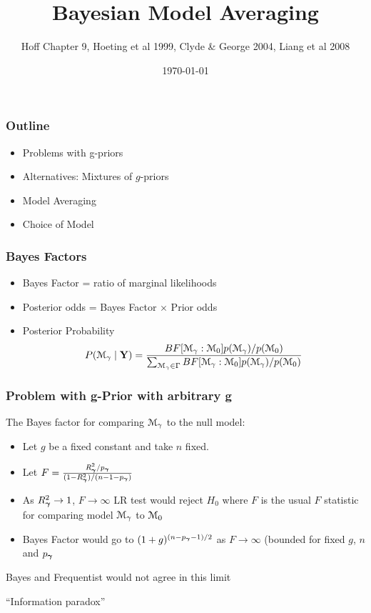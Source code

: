 \documentclass[handout]{beamer}\usepackage[]{graphicx}\usepackage[]{color}
\title{Bayesian Model Averaging}
\author{Hoff Chapter 9, Hoeting et al 1999, Clyde \& George 2004, Liang et al 2008}
\date{\today}
\begin{document}
\maketitle

\begin{frame} \frametitle{Outline}

\begin{itemize}
\item Problems with g-priors
\item Alternatives:  Mixtures of $g$-priors
\item Model Averaging
\item Choice of Model
\end{itemize}

\end{frame}

\begin{frame}
\frametitle{Bayes Factors}
\begin{itemize}
\item Bayes Factor = ratio of marginal likelihoods \pause

\item Posterior odds = Bayes Factor $\times$ Prior odds \pause

\item Posterior Probability
$$P({\cal M}_\gamma \mid \mathbf{Y}) = \frac{BF[{\cal M}_\gamma : {{\cal M}}_0] p({\cal M}_\gamma)/p({{\cal M}}_0)}
{\sum_{{\cal M}_\gamma \in \Gamma} BF[{\cal M}_\gamma : {{\cal M}}_0] p({\cal M}_\gamma)/p({{\cal M}}_0)}
$$

\end{itemize}
\end{frame}

\begin{frame}  \frametitle{Problem with g-Prior with arbitrary g}

The Bayes factor for comparing ${\cal M}_\gamma$ to the null
model:
\pause
\begin{itemize}
\item Let $g$ be a fixed constant and take $n$ fixed.\pause
\item Let $F = \frac{R_{\boldsymbol{\gamma}}^2/p_{\boldsymbol{\gamma}}}{(1 - R_{\boldsymbol{\gamma}}^2)/(n - 1 - p_{\boldsymbol{\gamma}})}$ \pause
\item As $R^2_{\boldsymbol{\gamma}} \to 1$, $F \to \infty$ LR test would reject $H_0$  where
 $F$ is the usual $F$ statistic for  comparing model ${\cal M}_\gamma$ to ${{\cal M}}_0$ \pause
\item Bayes Factor would go to $(1 + g)^{(n-p_{\boldsymbol{\gamma}} -1)/2}$ as $F \to \infty$  (bounded for fixed $g$, $n$ and $p_{\boldsymbol{\gamma}}$ \pause
\end{itemize}

Bayes and Frequentist would not agree in this limit \pause

\vspace{12pt}
``Information paradox''
\end{frame}
\end{document}
